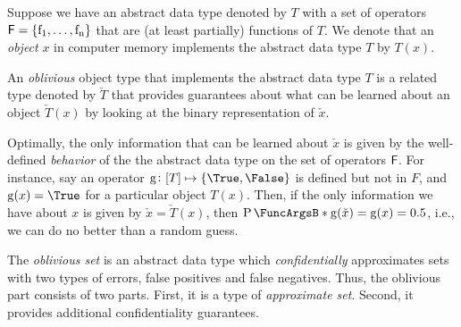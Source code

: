 \documentclass[ ../main.tex]{subfiles}
\begin{document}
Suppose we have an abstract data type denoted by $T$ with a set of operators $\Set{F} = \{ \operatorname{f_1},\ldots,\operatorname{f_n}\}$ that are (at least partially) functions of $T$. We denote that an \emph{object} $x$ in computer memory implements the abstract data type $T$ by $T(x)$.

An \emph{oblivious} object type\cite{obtype} that implements the abstract data type $T$ is a related type denoted by $\check{T}$ that provides guarantees about what can be learned about an object $\check{T}(x)$ by looking at the binary representation of $\check{x}$.

Optimally, the only information that can be learned about $\check{x}$ is given by the well-defined \emph{behavior} of the the abstract data type on the set of operators $\Set{F}$. For instance, say an operator $\operatorname{g} \colon [T] \mapsto \{\True,\False\}$ is defined but not in $F$, and $\operatorname{g}(x) = \True$ for a particular object $T(x)$. Then, if the only information we have about $x$ is given by $\check{x} = \check{T}(x)$, then $\Prob{\operatorname{g}(\check{x}) = \operatorname{g}(x)} = 0.5$, i.e., we can do no better than a random guess.


The \emph{oblivious set} is an abstract data type which \emph{confidentially} approximates sets with two types of errors, false positives and false negatives. Thus, the oblivious part consists of two parts. First, it is a type of \emph{approximate set}\cite{aset}. Second, it provides additional confidentiality guarantees.
\end{document}
